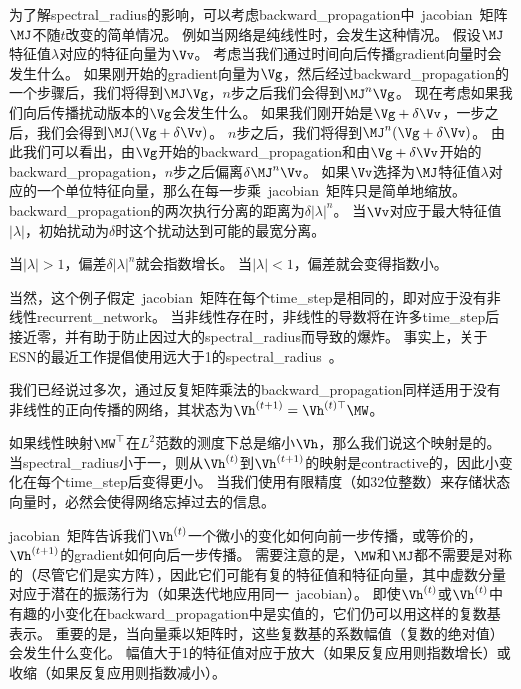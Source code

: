 为了解\gls{spectral_radius}的影响，可以考虑\gls{backward_propagation}中~\gls{jacobian}~矩阵$\MJ$不随$t$改变的简单情况。
例如当网络是纯线性时，会发生这种情况。
假设$\MJ$特征值$\lambda$对应的特征向量为$\Vv$。
考虑当我们通过时间向后传播\gls{gradient}向量时会发生什么。
如果刚开始的\gls{gradient}向量为$\Vg$，然后经过\gls{backward_propagation}的一个步骤后，我们将得到$\MJ \Vg$，$n$步之后我们会得到$\MJ^n \Vg$。
现在考虑如果我们向后传播扰动版本的$\Vg$会发生什么。
如果我们刚开始是$\Vg + \delta \Vv$，一步之后，我们会得到$\MJ(\Vg + \delta \Vv)$。
$n$步之后，我们将得到$\MJ^n(\Vg + \delta \Vv)$。
由此我们可以看出，由$\Vg$开始的\gls{backward_propagation}和由$\Vg+\delta \Vv$开始的\gls{backward_propagation}，$n$步之后偏离$\delta \MJ^n \Vv$。
如果$\Vv$选择为$\MJ$特征值$\lambda$对应的一个单位特征向量，那么在每一步乘~\gls{jacobian}~矩阵只是简单地缩放。
\gls{backward_propagation}的两次执行分离的距离为$\delta | \lambda |^n$。
当$\Vv$对应于最大特征值$|\lambda|$，初始扰动为$\delta$时这个扰动达到可能的最宽分离。

当$ | \lambda | > 1$，偏差$\delta | \lambda |^n$就会指数增长。
当$ | \lambda | < 1$，偏差就会变得指数小。


当然，这个例子假定~\gls{jacobian}~矩阵在每个\gls{time_step}是相同的，即对应于没有非线性\gls{recurrent_network}。
当非线性存在时，非线性的导数将在许多\gls{time_step}后接近零，并有助于防止因过大的\gls{spectral_radius}而导致的爆炸。
事实上，关于\gls{ESN}的最近工作提倡使用远大于1的\gls{spectral_radius}~\citep{Yildiz-et-al-2012,Jaeger-2012}。

我们已经说过多次，通过反复矩阵乘法的\gls{backward_propagation}同样适用于没有非线性的正向传播的网络，其状态为$\Vh^{(t+1)} = \Vh^{(t)\top} \MW $。

如果线性映射$\MW^\top$在$L^2$范数的测度下总是缩小$\Vh$，那么我们说这个映射是的。
当\gls{spectral_radius}小于一，则从$\Vh^{(t)}$到$\Vh^{(t+1)}$的映射是\gls{contractive}的，因此小变化在每个\gls{time_step}后变得更小。
当我们使用有限精度（如32位整数）来存储状态向量时，必然会使得网络忘掉过去的信息。

\gls{jacobian}~矩阵告诉我们$\Vh^{(t)}$一个微小的变化如何向前一步传播，或等价的，$\Vh^{(t+1)}$的\gls{gradient}如何向后一步传播。
需要注意的是，$\MW$和$\MJ$都不需要是对称的（尽管它们是实方阵），因此它们可能有复的特征值和特征向量，其中虚数分量对应于潜在的振荡行为（如果迭代地应用同一~\gls{jacobian}）。
即使$\Vh^{(t)}$或$\Vh^{(t)}$中有趣的小变化在\gls{backward_propagation}中是实值的，它们仍可以用这样的复数基表示。
重要的是，当向量乘以矩阵时，这些复数基的系数幅值（复数的绝对值）会发生什么变化。
幅值大于1的特征值对应于放大（如果反复应用则指数增长）或收缩（如果反复应用则指数减小）。

